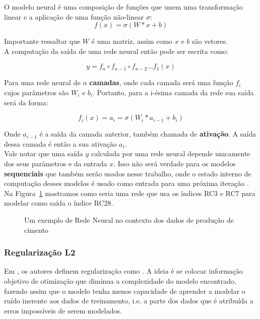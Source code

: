 O modelo neural é uma composição de funções que unem uma transformação linear e
a aplicação de uma função não-linear $\sigma$: \\

\[ f(x)=  \sigma(W*x + b) \]

Importante ressaltar que $W$ é uma matriz, assim como $x$ e $b$ são vetores. \\

A computação da saída de uma rede neural então pode ser escrita como:

\[   y = f_n \circ f_{n-1} \circ f_{n-2} \dots f_1(x)  \]

Para uma rede neural de $n$ \textbf{camadas}, onde cada camada será uma função
$f_i$ cujos parâmetros são $W_i$ e $b_i$. Portanto, para a i-ésima camada da rede
sua saída será da forma: 

\[ f_i (x)=  a_i = \sigma(W_i*a_{i-1} + b_i) \]

Onde $a_{i-1}$ é a saída da camada anterior, também chamada de
\textbf{ativação}. A saída dessa camada é então a sua ativação $a_i$. \\ 

Vale notar que uma saída $y$ calculada por uma rede neural depende unicamente dos
seus parâmetros e da entrada $x$. Isso não será verdade para os modelos
\textbf{sequenciais} que também serão usados nesse trabalho, onde o estado
interno de computação desses modelos é usado como entrada para uma próxima
iteração \citep{dlbook}. \\

Na Figura~\ref{fig:nn} mostramos como seria uma rede que usa os índices RC3 e RC7 para
modelar como saída o índice RC28. \\  

\begin{figure}
  \centering
  
  \caption{Um exemplo de Rede Neural no contexto dos dados de produção de cimento}
  \label{fig:nn}
\end{figure}


\bigskip

\subsubsection{Regularização L2}

Em \cite{dlbook}, os autores definem regularização como . A ideia é se colocar informação objetivo de 
otimização que diminua a complexidade do modelo encontrado, fazendo assim
que o modelo tenha menos capacidade de aprender a modelar o ruído inerente
aos dados de treinamento, i.e. a parte dos dados que é atribuída a erros
impossíveis de serem modelados.

